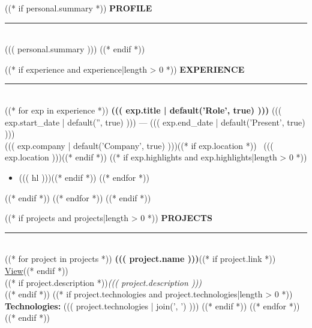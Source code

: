 \documentclass[11pt,a4paper]{article}
\begin{document}
\hfill
\begin{minipage}[t]{0.60\textwidth}
\color{body}
\vspace{9mm}
\hspace{6mm}
\begin{minipage}[t]{0.88\textwidth}

((* if personal.summary *))
{\fontsize{11}{13}\selectfont\bfseries\color{dark}\MakeUppercase{Profile}}\\[2pt]
{\color{dark!30}\rule{\linewidth}{0.4pt}}\\[6pt]
{\small ((( personal.summary )))}
\vspace{8pt}
((* endif *))

((* if experience and experience|length > 0 *))
{\fontsize{11}{13}\selectfont\bfseries\color{dark}\MakeUppercase{Experience}}\\[2pt]
{\color{dark!30}\rule{\linewidth}{0.4pt}}\\[8pt]
((* for exp in experience *))
{\bfseries ((( exp.title | default('Role', true) )))} \hfill {\small\color{muted} ((( exp.start_date | default('', true) ))) --- ((( exp.end_date | default('Present', true) )))}\\
{\small\color{muted} ((( exp.company | default('Company', true) )))((* if exp.location *)) \textbar\ ((( exp.location )))((* endif *))}
((* if exp.highlights and exp.highlights|length > 0 *))
\begin{itemize}[leftmargin=14pt, itemsep=1pt, parsep=0pt, topsep=3pt]
((* for hl in exp.highlights *))((* if hl *))\item {\small ((( hl )))}((* endif *))
((* endfor *))
\end{itemize}
((* endif *))
\vspace{8pt}
((* endfor *))
((* endif *))

((* if projects and projects|length > 0 *))
{\fontsize{11}{13}\selectfont\bfseries\color{dark}\MakeUppercase{Projects}}\\[2pt]
{\color{dark!30}\rule{\linewidth}{0.4pt}}\\[6pt]
((* for project in projects *))
{\bfseries ((( project.name )))}((* if project.link *)) \hfill {\scriptsize\href{((* if 'http' not in project.link *))https://((* endif *))((( project.link )))}{View}}((* endif *))\\
((* if project.description *)){\small\textit{((( project.description )))}}\\((* endif *))
((* if project.technologies and project.technologies|length > 0 *))
{\small\textbf{Technologies:} ((( project.technologies | join(', ') )))}
((* endif *))
\vspace{4pt}
((* endfor *))
((* endif *))


\end{minipage}
\end{minipage}
\end{document}
